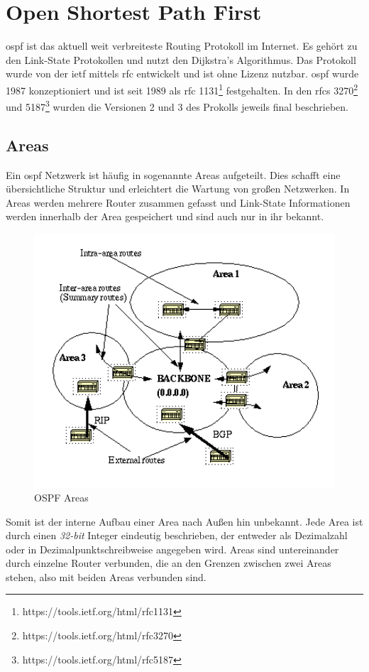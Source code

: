 \documentclass[11pt,a4paper,final]{article}
\begin{document}
\section{Open Shortest Path First}
\ac{ospf} ist das aktuell weit verbreiteste Routing Protokoll im Internet.
Es gehört zu den Link-State Protokollen und nutzt den Dijkstra's Algorithmus.
Das Protokoll wurde von der \ac{ietf} mittels \ac{rfc} entwickelt und ist ohne Lizenz nutzbar.
\ac{ospf} wurde 1987 konzeptioniert und ist seit 1989 als \ac{rfc} 1131\footnote{https://tools.ietf.org/html/rfc1131} festgehalten.
In den \ac{rfc}s 3270\footnote{https://tools.ietf.org/html/rfc3270} und 5187\footnote{https://tools.ietf.org/html/rfc5187} wurden die Versionen 2 und 3 des Prokolls jeweils final beschrieben.

\subsection{Areas}
Ein \ac{ospf} Netzwerk ist häufig in sogenannte Areas aufgeteilt.
Dies schafft eine übersichtliche Struktur und erleichtert die Wartung von großen Netzwerken. In Areas werden mehrere Router zusammen gefasst und Link-State Informationen werden innerhalb der Area gespeichert und sind auch nur in ihr bekannt.
\begin{figure}[H]
\includegraphics[width=1.0\textwidth]{images/ospfarea.png}
\caption[OSPF Areas]{OSPF Areas\footnotemark}
\label{fig:ospf-area}
\end{figure}
Somit ist der interne Aufbau einer Area nach Außen hin unbekannt.
Jede Area ist durch einen \textit{32-bit} Integer eindeutig beschrieben, der entweder als Dezimalzahl oder in Dezimalpunktschreibweise angegeben wird.
Areas sind untereinander durch einzelne Router verbunden, die an den Grenzen zwischen zwei Areas stehen, also mit beiden Areas verbunden sind.
\end{document}
